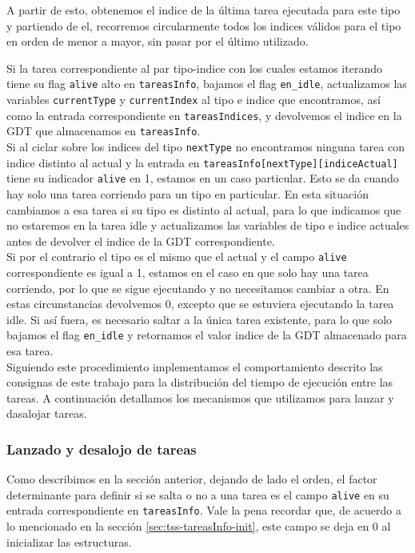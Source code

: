 A partir de esto, obtenemos el indice de la última tarea ejecutada para este tipo y partiendo de el, recorremos circularmente todos los indices válidos para el tipo en orden de menor a mayor, sin pasar por el último utilizado.

Si la tarea correspondiente al par tipo-indice con los cuales estamos iterando tiene su flag \verb|alive| alto en \verb|tareasInfo|, bajamos el flag \verb|en_idle|, actualizamos las variables \verb|currentType| y \verb|currentIndex| al tipo e indice que encontramos, así como la entrada correspondiente en \verb|tareasIndices|, y devolvemos el indice en la GDT que almacenamos en \verb|tareasInfo|.
\\

Si al ciclar sobre los indices del tipo \verb|nextType| no encontramos ninguna tarea con indice distinto al actual y la entrada en \verb|tareasInfo[nextType][indiceActual]| tiene su indicador \verb|alive| en 1, estamos en un caso particular. 
Esto se da cuando hay solo una tarea corriendo para un tipo en particular. 
En esta situación cambiamos a esa tarea si su tipo es distinto al actual, para lo que indicamos que no estaremos en la tarea idle y actualizamos las variables de tipo e indice actuales antes de devolver el indice de la GDT correspondiente. \\
Si por el contrario el tipo es el mismo que el actual y el campo \verb|alive| correspondiente es igual a 1, estamos en el caso en que solo hay una tarea corriendo, por lo que se sigue ejecutando y no necesitamos cambiar a otra. En estas circunstancias devolvemos 0, excepto que se estuviera ejecutando la tarea idle. Si así fuera, es necesario saltar a la única tarea existente, para lo que solo bajamos el flag \verb|en_idle| y retornamos el valor indice de la GDT almacenado para esa tarea.\\

Siguiendo este procedimiento implementamos el comportamiento descrito las consignas de este trabajo para la distribución del tiempo de ejecución entre las tareas. A continuación detallamos los mecanismos que utilizamos para lanzar y dasalojar tareas.


\subsubsection{Lanzado y desalojo de tareas}

Como describimos en la sección anterior, dejando de lado el orden, el factor determinante para definir si se salta o no a una tarea es el campo \verb|alive| en su entrada correspondiente en \verb|tareasInfo|. Vale la pena recordar que, de acuerdo a lo mencionado en la sección \ref{sec:tss-tareasInfo-init}, este campo se deja en 0 al inicializar las estructuras.

